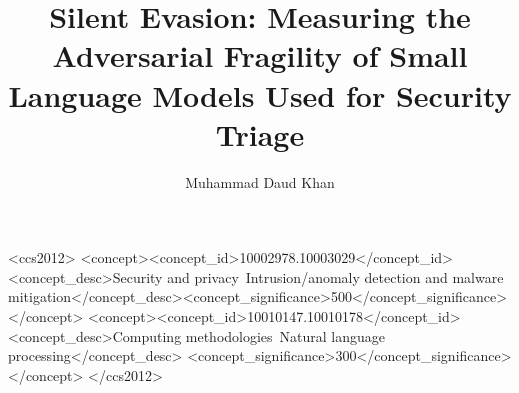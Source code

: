\documentclass[sigconf,nonacm]{acmart}
\begin{document}
\title{Silent Evasion: Measuring the Adversarial Fragility of Small Language
Models Used for Security Triage}

\author{Muhammad Daud Khan}

\renewcommand{\shortauthors}{M. D. Khan}




\begin{CCSXML}
<ccs2012>
 <concept><concept_id>10002978.10003029</concept_id>
  <concept_desc>Security and privacy~Intrusion/anomaly detection and malware
  mitigation</concept_desc><concept_significance>500</concept_significance></concept>
 <concept><concept_id>10010147.10010178</concept_id>
  <concept_desc>Computing methodologies~Natural language processing</concept_desc>
  <concept_significance>300</concept_significance></concept>
</ccs2012>
\end{CCSXML}


\maketitle














\end{document}
